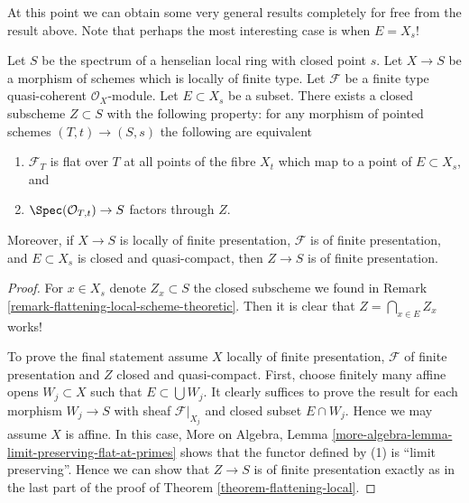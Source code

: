 \noindent
At this point we can obtain some very general results completely
for free from the result above. Note that perhaps the most interesting
case is when $E = X_s$!

\begin{lemma}
\label{lemma-freebie}
Let $S$ be the spectrum of a henselian local ring with closed point $s$.
Let $X \to S$ be a morphism of schemes which is locally of finite type.
Let $\mathcal{F}$ be a finite type quasi-coherent $\mathcal{O}_X$-module.
Let $E \subset X_s$ be a subset. There exists a closed subscheme
$Z \subset S$ with the following property: for any morphism of pointed
schemes $(T, t) \to (S, s)$ the following are equivalent
\begin{enumerate}
\item $\mathcal{F}_T$ is flat over $T$ at all points of the fibre
$X_t$ which map to a point of $E \subset X_s$, and
\item $\Spec(\mathcal{O}_{T, t}) \to S$ factors through $Z$.
\end{enumerate}
Moreover, if $X \to S$ is locally of finite presentation,
$\mathcal{F}$ is of finite presentation, and $E \subset X_s$ is
closed and quasi-compact, then $Z \to S$ is of finite presentation.
\end{lemma}

\begin{proof}
For $x \in X_s$ denote $Z_x \subset S$ the closed subscheme we found in
Remark \ref{remark-flattening-local-scheme-theoretic}.
Then it is clear that $Z = \bigcap_{x \in E} Z_x$ works!

\medskip\noindent
To prove the final statement assume $X$ locally of finite presentation,
$\mathcal{F}$ of finite presentation and $Z$ closed and quasi-compact.
First, choose finitely many affine opens $W_j \subset X$ such that
$E \subset \bigcup W_j$. It clearly suffices to prove the
result for each morphism $W_j \to S$ with sheaf $\mathcal{F}|_{X_j}$
and closed subset $E \cap W_j$. Hence we may assume $X$ is affine.
In this case,
More on Algebra, Lemma \ref{more-algebra-lemma-limit-preserving-flat-at-primes}
shows that the functor defined by (1) is ``limit preserving''.
Hence we can show that $Z \to S$ is of finite presentation exactly
as in the last part of the proof of
Theorem \ref{theorem-flattening-local}.
\end{proof}

